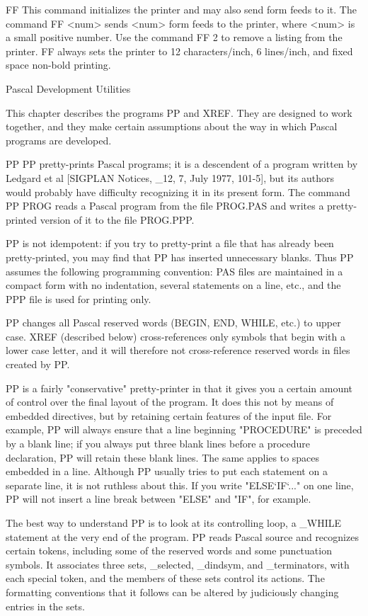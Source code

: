 \se FF
This command initializes the printer and may also send form feeds to it.
The command
\bd FF <num> \ed
sends <num> form feeds to the printer, where <num> is a small positive
number.
Use the command
\bd FF 2 \ed
to remove a listing from the printer.
\pa FF always sets the printer to 12 characters/inch, 6 lines/inch,
and fixed space non-bold printing.

\ch Pascal Development Utilities

This chapter describes the programs PP and XREF.
They are designed to work together, and they make certain assumptions about
the way in which Pascal programs are developed.

\se PP
PP pretty-prints Pascal programs; it is a descendent of a program written
by Ledgard et al [SIGPLAN Notices, _12, 7, July 1977, 101-5], but its authors
would probably have difficulty recognizing it in its present form.
The command \bd PP PROG \ed reads a Pascal program from the file PROG.PAS and
writes a pretty-printed version of it to the file PROG.PPP.

\pa PP is not idempotent: if you try to pretty-print a file that has
already been pretty-printed, you may find that PP has inserted unnecessary
blanks.
Thus PP assumes the following programming convention: PAS files are
maintained in a compact form with no indentation, several statements
on a line, etc., and the PPP file is used for printing only.

\pa PP changes all Pascal reserved words (BEGIN, END, WHILE, etc.)
to upper case.
XREF (described below) cross-references only symbols that begin with a
lower case letter, and it will therefore not cross-reference reserved words 
in files created by PP.

\pa PP is a fairly "conservative" pretty-printer in that it gives you a
certain amount of control over the final layout of the program.
It does this not by means of embedded directives, but by retaining
certain features of the input file.
For example, PP will always ensure that a line beginning "PROCEDURE"
is preceded by a blank line; if you always put three blank lines before a
procedure declaration, PP will retain these blank lines.
The same applies to spaces embedded in a line.
Although PP usually tries to put each statement on a separate line,
it is not ruthless about this.
If you write "ELSE`IF`..." on one line, PP will not insert a line break
between "ELSE" and "IF", for example.

\pa The best way to understand PP is to look at its controlling loop, a
_WHILE statement at the very end of the program.
PP reads Pascal source and recognizes certain tokens, including some of the
reserved words and some punctuation symbols.
It associates three sets, _selected, _dindsym, and _terminators, with each
special token, and the members of these sets control its actions.
The formatting conventions that it follows can be altered by judiciously
changing entries in the sets.

